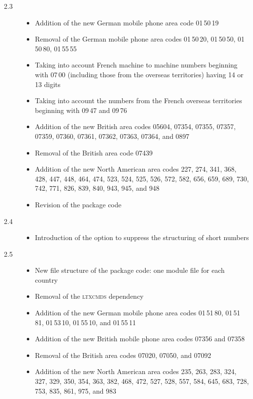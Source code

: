 \documentclass[numbers=noenddot]{scrreprt}
\newcommand*\Paket[1]{\textsc{#1}}
\begin{document}
\begin{description}
\begin{itemize}
\end{itemize}
\item[2.3] 
\begin{itemize}
\item Addition of the new German mobile phone area code 01\,50\,19
\item Removal of the German mobile phone area codes 01\,50\,20, 01\,50\,50, 01\,50\,80, 01\,55\,55
\item Taking into account French machine to machine numbers beginning with 07\,00 (including those from the overseas territories) having 14 or 13 digits
\item Taking into account the numbers from the French overseas territories beginning with 09\,47 and 09\,76
\item Addition of the new British area codes 05604, 07354, 07355, 07357, 07359, 07360, 07361, 07362, 07363, 07364, and 0897
\item Removal of the British area code 07439
\item Addition of the new North American area codes 227, 274, 341, 368, 428, 447, 448, 464, 474, 523, 524, 525, 526, 572, 582, 656, 659, 689, 730, 742, 771, 826, 839, 840, 943, 945, and 948
\item Revision of the package code
\end{itemize}
\item[2.4] 
\begin{itemize}
\item Introduction of the
 option to suppress the structuring of short numbers
\end{itemize}
\item[2.5] 
\begin{itemize}
\item New file structure of the package code: one module file for each country
\item Removal of the \Paket{ltxcmds} dependency
\item Addition of the new German mobile phone area codes 01\,51\,80, 01\,51\,81, 01\,53\,10, 01\,55\,10, and 01\,55\,11
\item Addition of the new British mobile phone area codes 07356 and 07358
\item Removal of the British area codes 07020, 07050, and 07092
\item Addition of the new North American area codes 235, 263, 283, 324, 327, 329, 350, 354, 363, 382, 468, 472, 527, 528, 557, 584, 645, 683, 728, 753, 835, 861, 975, and 983

\end{itemize}
\end{description}
\end{document}

